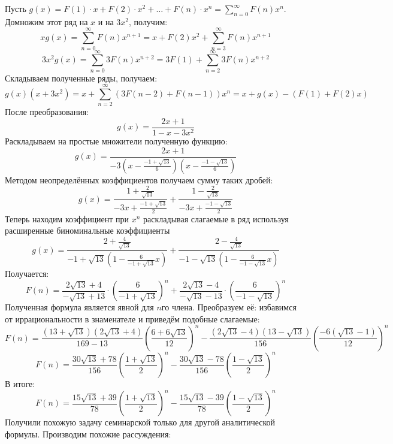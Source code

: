 \documentclass[a4paper,12pt]{article} %
\begin{document}
Пусть $ g(x) = F(1) \cdot x + F(2) \cdot x^2 + \ldots + F(n) \cdot x^n = \sum\limits_{n = 0}^{\infty} F(n)x^n$.\\
Домножим этот ряд на $ x $ и на $ 3x^2 $, получим:\\
$$
xg(x) = \sum\limits_{n = 0}^{\infty} F(n)x^{n+1} = x + F(2)x^2 + \sum\limits_{n = 3}^{\infty} F(n)x^{n+1}
$$
$$
3x^2 g(x) = \sum\limits_{n = 0}^{\infty} 3F(n)x^{n+2} = 3F(1) + \sum\limits_{n = 2}^{\infty} 3F(n)x^{n+2}
$$
Складываем полученные ряды, получаем:\\
$$
g(x) (x+3x^2) = x + \sum\limits_{n = 2}^{\infty} (3F(n-2) + F(n-1))x^{n} = x + g(x) - (F(1) + F(2)x)
$$
После преобразования: 
$$
g(x) = \frac{2x+1}{1-x-3x^2} 
$$
Раскладываем на простые множители полученную функцию:
$$
g(x) = \frac{2x+1}{-3\left(x-\frac{-1+\sqrt{13}}{6}\right)\left(x-\frac{-1-\sqrt{13}}{6}\right)}
$$
Методом неопределённых коэффициентов получаем сумму таких дробей:
$$
g(x) = \frac{1+\frac{2}{\sqrt{13}}}{-3 x+\frac{-1+\sqrt{13}}{2}}+\frac{1-\frac{2}{\sqrt{13}}}{-3 x+\frac{-1-\sqrt{13}}{2}}
$$
Теперь находим коэффициент при $ x^n $ раскладывая слагаемые в ряд используя расширенные биноминальные коэффициенты\\
$$
g(x) = \frac{2+\frac{4}{\sqrt{13}}}{-1+\sqrt{13}\left(1-\frac{6}{-1+\sqrt{13}} x\right)}+\frac{2-\frac{4}{\sqrt{13}}}{-1-\sqrt{13}\left(1-\frac{6}{-1-\sqrt{13}} x\right)}
$$
Получается:
$$
F(n)=\frac{2 \sqrt{13}+4}{-\sqrt{13}+13} \cdot\left(\frac{6}{-1+\sqrt{13}}\right)^{n}+\frac{2 \sqrt{13}-4}{-\sqrt{13}-13} \cdot\left(\frac{6}{-1-\sqrt{13}}\right)^{n}
$$
Полученная формула является явной для $ n $го члена. Преобразуем её: избавимся от иррациональности в знаменателе и приведём подобные слагаемые:\\
$$
F(n)=\frac{(13+\sqrt{13})(2 \sqrt{13}+4)}{169-13}\left(\frac{6+6 \sqrt{13}}{12}\right)^{n}-\frac{(2 \sqrt{13}-4)(13-\sqrt{13})}{156} \left(\frac{-6(\sqrt{13}-1)}{12} \right)^n
$$
$$
F(n)=\frac{30 \sqrt{13}+78}{156}\left(\frac{1+\sqrt{13}}{2}\right)^{n}-\frac{30 \sqrt{13}-78}{156}\left(\frac{1-\sqrt{13}}{2}\right)^{n}
$$
В итоге: 
\begin{equation}
F(n) = \frac{15 \sqrt{13}+39}{78}\left(\frac{1+\sqrt{13}}{2}\right)^{n}-\frac{15 \sqrt{13}-39}{78}\left(\frac{1-\sqrt{13}}{2}\right)^{n}
\end{equation}
Получили похожую задачу семинарской только для другой аналитической формулы. Производим похожие рассуждения:\\
\end{document}
